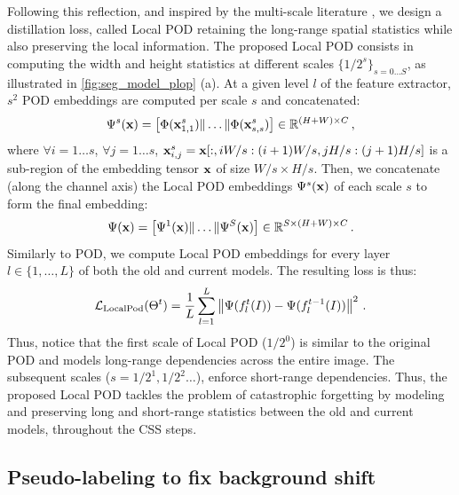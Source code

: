 Following this reflection, and inspired by the multi-scale literature
\citep{lazbnik2006spatial_pyramid_matching,he2014spatialpyramidpooling}, we design a distillation
loss, called Local POD retaining the long-range spatial statistics while also preserving the local
information. The proposed Local POD consists in computing the width and height statistics at
different scales $\{1/2^s\}_{s=0 \dots S}$, as illustrated in \autoref{fig:seg_model_plop} (a). At a
given level $l$ of the feature extractor, $s^2$ POD embeddings are computed per scale $s$ and
concatenated:
%
\begin{equation}
    \Psi^s(\mathbf{x}) = \left[ \Phi(\mathbf{x}^s_{1,1}) \| \dots \| \Phi(\mathbf{x}^s_{s,s}) \right] \in \mathbb{R}^{(H + W) \times C}\,,
    \label{eq:seg_localpod_embedding1}
\end{equation}
%
where $\forall i = 1 \dots s$, $\forall j = 1 \dots s$, $\mathbf{x}^s_{i,j} = \mathbf{x}[:, i W/s:(i+1) W/s, j
        H/s:(j+1) H/s]$ is a sub-region of the embedding tensor $\mathbf{x}$ of size $W/s \times H/s$.
Then, we concatenate (along the channel axis) the Local POD embeddings $\Psi^s(\mathbf{x})$ of each
scale $s$ to form the final embedding:
%
\begin{equation}
    \Psi(\mathbf{x}) = \left[ \Psi^1(\mathbf{x}) \| \dots \| \Psi^S(\mathbf{x}) \right] \in \mathbb{R}^{S \times (H + W) \times C}\,.
    \label{eq:seg_local_pod}
\end{equation}
%
Similarly to POD, we compute Local POD embeddings for every layer $l \in \{1, \dots, L\}$ of both
the old and current models. The resulting loss is thus:
%
\begin{equation}
    \mathcal{L}_{\scriptstyle\text{LocalPod}}(\Theta^t) = \frac{1}{L} \sum_{l = 1}^L \left\Vert  {\Psi}(f^t_l(I)) -  {\Psi}(f^{t-1}_l(I)) \right\Vert^2\,.
    \label{eq:seg_local_pod_loss}
\end{equation}
%
Thus, notice that the first scale of Local POD ($1/2^0$) is similar to the original POD and models
long-range dependencies across the entire image. The subsequent scales ($s=1/2^1, 1/2^2 \dots$),
enforce short-range dependencies. Thus, the proposed Local POD tackles the problem of catastrophic
forgetting by modeling and preserving long and short-range statistics between the old and current
models, throughout the \ac{CSS} steps.


\subsection{Pseudo-labeling to fix background shift}\label{sec:seg_hardpl}

